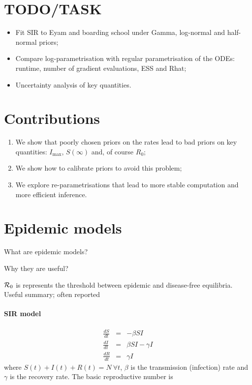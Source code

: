 \documentclass[alpha-refs]{wiley-article}
\newcommand{\rr}{ {\cal R}_0 }						%
\begin{document}
\section*{TODO/TASK}
\begin{itemize}
 \item Fit SIR to Eyam and boarding school under Gamma, log-normal and half-normal priors;
 \item Compare log-parametrisation with regular parametrisation of the ODEs: runtime, number of gradient evaluations, ESS and Rhat;
 \item Uncertainty analysis of key quantities.
\end{itemize}

\section*{Contributions}
\begin{enumerate}
 \item We show that poorly chosen priors on the rates lead to bad priors on key quantities: $I_{\max}$, $S(\infty)$ and, of course $R_0$;
 \item We show how to calibrate priors to avoid this problem;
 \item We explore re-parametrisations that lead to more stable computation and more efficient inference.
\end{enumerate}


\section{Epidemic models}

What are epidemic models?

Why they are useful?

$\rr$ is represents the threshold between epidemic and disease-free equilibria.
Useful summary; often reported

\paragraph{SIR model}

\begin{eqnarray*}
\frac{dS}{dt}&=& - \beta SI\\
\frac{dI}{dt}&=&  \beta SI - \gamma I\\
\frac{dR}{dt}&=& \gamma I 
\end{eqnarray*} 
where  $S(t) + I(t) + R(t) = N \: \forall t$, $\beta$ is the transmission (infection) rate and $\gamma$ is the recovery rate.
The basic reproductive number is 
\end{document}
